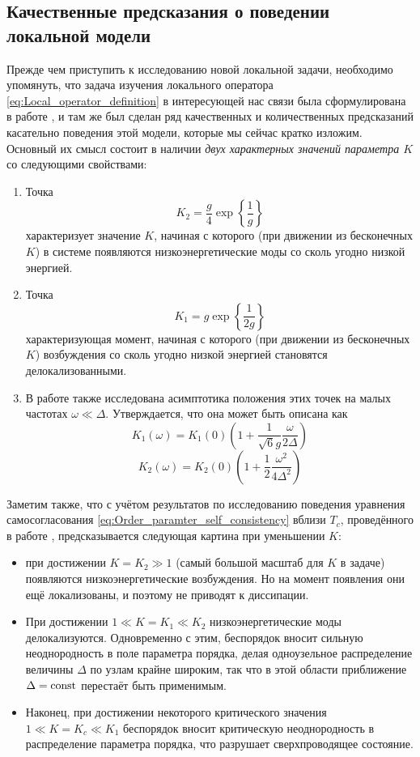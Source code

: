 \subsection{Качественные предсказания о поведении локальной модели}
Прежде чем приступить к исследованию новой локальной задачи, необходимо упомянуть, что задача изучения локального оператора \eqref{eq:Local_operator_definition} в интересующей нас связи была сформулирована в работе \cite{FI_microwave}, и там же был сделан ряд качественных и количественных предсказаний касательно поведения этой модели, которые мы сейчас кратко изложим. Основный их смысл состоит в наличии \textit{двух характерных значений параметра $K$} со следующими свойствами:
\begin{enumerate}
	\item Точка
	\begin{equation}
		\label{eq:K2_definition}
		K_2 = \frac{g}{4} \exp \left\{ \frac{1}{g} \right\}
	\end{equation}	
	характеризует значение $K$, начиная с которого (при движении из бесконечных $K$) в системе появляются низкоэнергетические моды со сколь угодно низкой энергией.
	\item Точка
	\begin{equation}
		\label{eq:K1_definition}
		K_1 = g \exp \left\{ \frac{1}{2g} \right\}
	\end{equation}
	характеризующая момент, начиная с которого (при движении из бесконечных $K$) возбуждения со сколь угодно низкой энергией становятся делокализованными.
	\item В работе также исследована асимптотика положения этих точек на малых частотах $\omega \ll \Delta$. Утверждается, что она может быть описана как
	$$
	K_1(\omega) = K_1(0) \left(1 + \frac{1}{\sqrt{6}g} \frac{\omega}{2 \Delta} \right)
	$$
	$$
	K_2(\omega) = K_2(0) \left(1 + \frac{1}{2} \frac{\omega^2}{4 \Delta^2} \right)
	$$
\end{enumerate}
Заметим также, что с учётом результатов по исследованию поведения уравнения самосогласования \eqref{eq:Order_paramter_self_consistency} вблизи $T_c$, проведённого в работе \cite{Feigelman_et_al_2010}, предсказывается следующая картина при уменьшении $K$:
\begin{itemize}
	\item при достижении $K = K_2 \gg 1$ (самый большой масштаб для $K$ в задаче) появляются низкоэнергетические возбуждения. Но на момент появления они ещё локализованы, и поэтому не приводят к диссипации.
	\item При достижении $1 \ll K = K_1 \ll K_2$ низкоэнергетические моды делокализуются. Одновременно с этим, беспорядок вносит сильную неоднородность в поле параметра порядка, делая одноузельное распределение величины $\Delta$ по узлам крайне широким, так что в этой области приближение $\Delta = \operatorname{const}$ перестаёт быть применимым.
	\item Наконец, при достижении некоторого критического значения $1 \ll K = K_c \ll K_1$ беспорядок вносит критическую неоднородность в распределение параметра порядка, что разрушает сверхпроводящее состояние.
\end{itemize}
